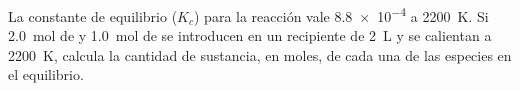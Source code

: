 La constante de equilibrio ($K_c$) para la reacción  vale \num{8,8e-4} a \SI{2200}{\kelvin}. Si \SI{2,0}{\mol} de  y \SI{1,0}{\mol} de  se introducen en un recipiente de \SI{2}{\liter} y se calientan a \SI{2200}{\kelvin}, calcula la cantidad de sustancia, en moles, de cada una de las especies en el equilibrio.
